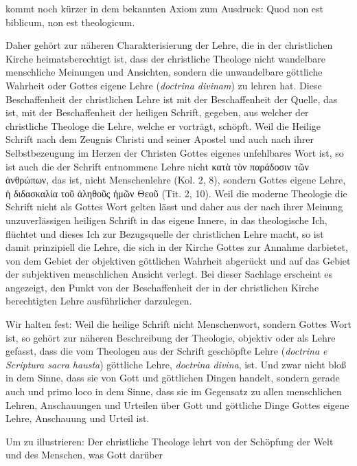 kommt noch kürzer in dem bekannten Axiom zum Ausdruck: Quod non est biblicum, non est theologicum.

Daher gehört zur näheren Charakterisierung der Lehre, die in der christlichen Kirche heimatsberechtigt ist, dass der christliche Theologe nicht wandelbare menschliche Meinungen und Ansichten, sondern die unwandelbare göttliche Wahrheit oder Gottes eigene Lehre (\emph{doctrina divinam}) zu lehren hat. Diese Beschaffenheit der christlichen Lehre ist mit der Beschaffenheit der Quelle, das ist, mit der Beschaffenheit der heiligen Schrift, gegeben, aus welcher der christliche Theologe die Lehre, welche er vorträgt, schöpft. Weil die Heilige Schrift nach dem Zeugnis Christi und seiner Apostel und auch nach ihrer Selbstbezeugung im Herzen der Christen Gottes eigenes unfehlbares Wort ist, so ist auch die der Schrift entnommene Lehre nicht \textgreek{κατὰ τὸν παράδοσιν τῶν ἀνθρώπων}, das ist, nicht Menschenlehre (Kol. 2, 8), sondern Gottes eigene Lehre, \textgreek{ἡ διδασκαλία τοῦ ἀληθοῦς ἡμῶν Θεοῦ} (Tit. 2, 10). Weil die moderne Theologie die Schrift nicht als Gottes Wort gelten lässt und daher aus der nach ihrer Meinung unzuverlässigen heiligen Schrift in das eigene Innere, in das theologische Ich, flüchtet und dieses Ich zur Bezugsquelle der christlichen Lehre macht, so ist damit prinzipiell die Lehre, die sich in der Kirche Gottes zur Annahme darbietet, von dem Gebiet der objektiven göttlichen Wahrheit abgerückt und auf das Gebiet der subjektiven menschlichen Ansicht verlegt. Bei dieser Sachlage erscheint es angezeigt, den Punkt von der Beschaffenheit der in der christlichen Kirche berechtigten Lehre ausführlicher darzulegen.

Wir halten fest: Weil die heilige Schrift nicht Menschenwort, sondern Gottes Wort ist, so gehört zur näheren Beschreibung der Theologie, objektiv oder als Lehre gefasst, dass die vom Theologen aus der Schrift geschöpfte Lehre (\emph{doctrina e Scriptura sacra hausta}) göttliche Lehre, \emph{doctrina divina}, ist. Und zwar nicht bloß in dem Sinne, dass sie von Gott und göttlichen Dingen handelt, sondern gerade auch und primo loco in dem Sinne, dass sie im Gegensatz zu allen menschlichen Lehren, Anschauungen und Urteilen über Gott und göttliche Dinge Gottes eigene Lehre, Anschauung und Urteil ist.

Um zu illustrieren: Der christliche Theologe lehrt von der Schöpfung der Welt und des Menschen, was Gott darüber